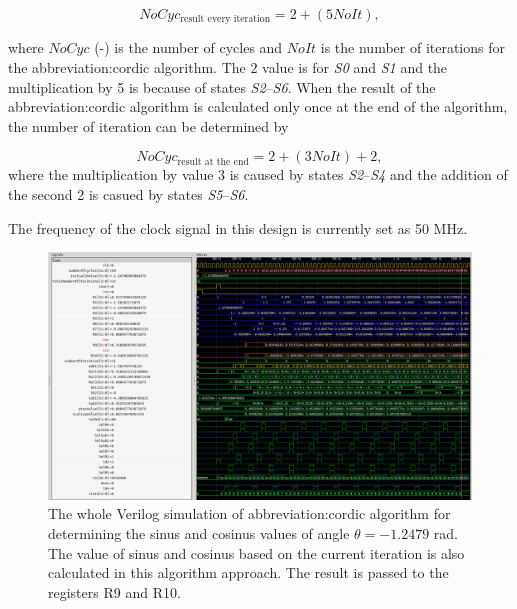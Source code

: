 \documentclass[a4paper, twoside, 11pt]{article}
\begin{document}
    \begin{equation}
        NoCyc_\text{result every iteration} = 2 + (5 NoIt),
    \end{equation}

    where $NoCyc$ (-) is the number of cycles and $NoIt$ is the number of iterations for the \gls{abbreviation:cordic} algorithm. The $2$ value is for \textit{S0} and \textit{S1} and the multiplication by 5 is because of states \textit{S2}–\textit{S6}. When the result of the \gls{abbreviation:cordic} algorithm is calculated only once at the end of the algorithm, the number of iteration can be determined by

    \begin{equation}
        NoCyc_\text{result at the end} = 2 + (3 NoIt) + 2,
    \end{equation}
    where the multiplication by value 3 is caused by states \textit{S2}–\textit{S4} and the addition of the second 2 is casued by states \textit{S5}–\textit{S6}.\par

    The frequency of the clock signal in this design is currently set as 50 MHz.

        \begin{figure}[htbp!]
            \centering
            \includegraphics[width=1\textwidth]{src/png/cordic-verilog-whole-sim.png}
            \caption{The whole Verilog simulation of \gls{abbreviation:cordic} algorithm for determining the sinus and cosinus values of angle $\theta = -1.2479$ rad. The value of sinus and cosinus based on the current iteration is also calculated in this algorithm approach. The result is passed to the registers R9 and R10.}
            \label{fig:cordic-verilog-whole-sim}
        \end{figure}
\end{document}
